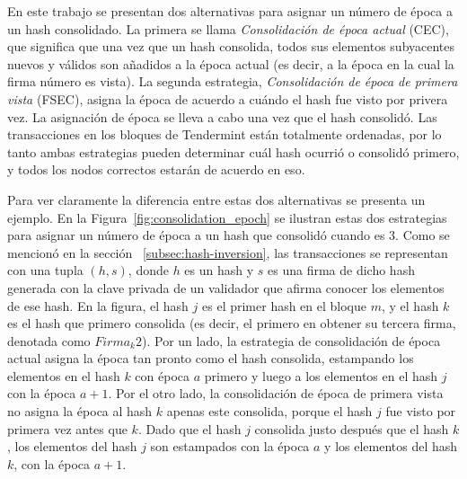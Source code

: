 %
%

%

En este trabajo se presentan dos alternativas para asignar un número de época a un hash consolidado.
%
La primera se llama \textit{Consolidación de época actual} (CEC), que significa que 
una vez que un hash consolida, todos sus elementos subyacentes nuevos y válidos son
añadidos a la época actual
(es decir, a la época en la cual la firma número \SPH es vista).
%
La segunda estrategia, \textit{Consolidación de época de primera vista} (FSEC), asigna la época
de acuerdo a cuándo el hash fue visto por privera vez. La asignación de época se lleva
a cabo una vez que el hash consolidó. 
%
Las transacciones
en los bloques de Tendermint están totalmente ordenadas,
por lo tanto ambas estrategias pueden determinar cuál hash ocurrió o consolidó primero, y
todos los nodos correctos estarán de acuerdo en eso.

%
Para ver claramente la diferencia entre estas dos alternativas se presenta un ejemplo.
%
En la Figura~\ref{fig:consolidation_epoch} se ilustran estas dos estrategias para asignar
un número de época a un hash que consolidó cuando \SPH es 3.
%
Como se mencionó en la sección ~\ref{subsec:hash-inversion}, las transacciones se representan
con una tupla $(h, s)$, donde $h$ es un hash y $s$ es una firma de dicho hash generada con la
clave privada de un validador que afirma conocer los elementos de ese hash.
%
En la figura, el hash $j$ es el primer hash en el bloque $m$, y el hash $k$ es el hash que primero consolida
(es decir, el primero en obtener su tercera firma, denotada como $Firma_{k}2$).
%
Por un lado, la estrategia de consolidación de época actual asigna la época tan pronto como
el hash consolida, estampando los elementos en el hash $k$ con época $a$ primero y luego
a los elementos en el hash $j$ con la época $a+1$.
%
Por el otro lado, la consolidación de época de primera vista no asigna la época al hash $k$
apenas este consolida, porque el hash $j$ fue visto por primera vez antes que $k$.
%
Dado que el hash $j$ consolida justo después que el hash $k$, los elementos del hash $j$ son
estampados
con la época $a$ y los elementos del hash $k$, con la época $a+1$. 

